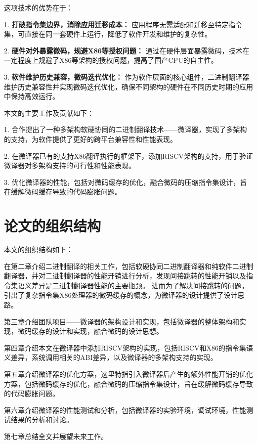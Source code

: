 这项技术的优势在于：

1. \textbf{打破指令集边界，消除应用迁移成本：} 应用程序无需适配和迁移至特定指令集，可直接在同一套硬件上运行，降低了软件开发和维护的复杂性。

2. \textbf{硬件对外暴露微码，规避X86等授权问题：} 通过在硬件层面暴露微码，技术在一定程度上规避了X86等架构的授权问题，提高了国产CPU的自主性。

3. \textbf{软件维护历史兼容，微码迭代优化：} 作为软件层面的核心组件，二进制翻译器维护历史兼容性并实现微码迭代优化，确保不同架构的硬件在不同历史时期的应用中保持高效运行。

本文的主要工作及贡献如下：

1. 合作提出了一种多架构软硬协同的二进制翻译技术——微译器，实现了多架构的支持，为软件提供了更好的跨平台兼容性和性能表现。

2. 在微译器已有的支持X86翻译执行的框架下，添加RISCV架构的支持，用于验证微译器对多架构支持的可行性和性能表现。

3. 优化微译器的性能，包括对微码缓存的优化，融合微码的压缩指令集设计，旨在缓解微码缓存导致的代码膨胀问题。


\section{论文的组织结构}

本文的组织结构如下：

在第二章介绍二进制翻译的相关工作，包括软硬协同二进制翻译器和纯软件二进制翻译器，并对二进制翻译器的性能开销进行分析，发现间接跳转的性能开销以及指令集语义差异是二进制翻译器性能的主要瓶颈。
进而为了解决间接跳转的问题，引出了复杂指令集X86处理器的微码缓存的概念，为微译器的设计提供了设计思路。

第三章介绍团队项目——微译器的架构设计和实现，包括微译器的整体架构和实现，微码缓存的设计和实现，融合微码的设计思想。

第四章介绍本文在微译器中添加RISCV架构的实现，包括RISCV和X86的指令集语义差异，系统调用相关的ABI差异，以及微译器的多架构支持的实现。

第五章介绍微译器的优化方案，这里特指引入微译器后产生的额外性能开销的优化方案，包括微码缓存的优化，融合微码的压缩指令集设计，旨在缓解微码缓存导致的代码膨胀问题。

第六章介绍微译器的性能测试和分析，包括微译器的实验环境，调试环境，性能测试结果的分析和讨论。

第七章总结全文并展望未来工作。

